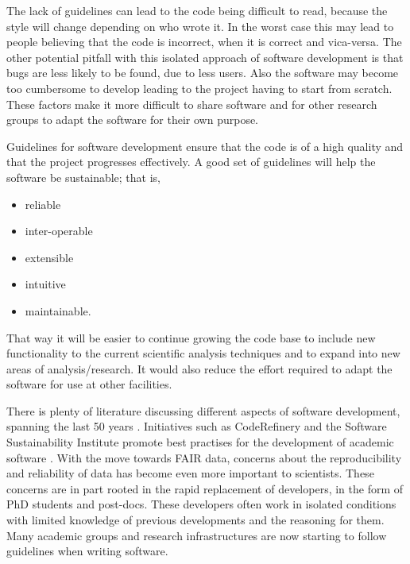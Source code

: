 \documentclass[jnr]{iosart2x}
\begin{document}
The lack of guidelines can lead to the code being difficult to read, because the style will change depending on who wrote it.
In the worst case this may lead to people believing that the code is incorrect, when it is correct and vica-versa.
The other potential pitfall with this isolated approach of software development is that bugs are less likely to be found, due to less users.
Also the software may become too cumbersome to develop leading to the project having to start from scratch.
These factors make it more difficult to share software and for other research groups to adapt the software for their own purpose.

Guidelines for software development ensure that the code is of a high quality and that the project progresses effectively.
A good set of guidelines will help the software be sustainable; that is,
\begin{itemize}
\item{reliable}
\item{inter-operable}
\item{extensible}
\item{intuitive}
\item{maintainable.}
\end{itemize}
That way it will be easier to continue growing the code base to include new functionality to the current scientific analysis techniques and to expand into new areas of analysis/research.
It would also reduce the effort required to adapt the software for use at other facilities.

There is plenty of literature discussing different aspects of software development, spanning the last 50 years \cite{scientific_fortran, fair_software}.
Initiatives such as  CodeRefinery \cite{coderefinery} and the Software Sustainability Institute \cite{SoftwareSustainabilityInstitute} promote best practises for the development of academic software \cite{fair_software}.
With the move towards FAIR data, concerns about the reproducibility and reliability of data has become even more important to scientists.
These concerns are in part rooted in the rapid replacement of developers, in the form of PhD students and post-docs.
These developers often work in isolated conditions with limited knowledge of previous developments and the reasoning for them.
Many academic groups and research infrastructures are now starting to follow guidelines when writing software.
\end{document}
